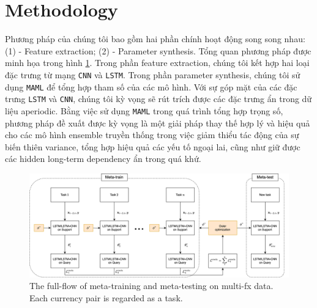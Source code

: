 \documentclass[aps,prb,groupedaddress,twocolumn,showpacs,dvipdfmx,superscriptaddress,pdftex]{revtex4-2}
\begin{document}
\section{Methodology}
\label{sec.method}

Phương pháp của chúng tôi bao gồm hai phần chính hoạt động song song nhau: (1) - Feature extraction; (2) - Parameter synthesis. Tổng quan phương pháp được minh họa trong hình \ref{fig:flow}. Trong phần feature extraction, chúng tôi kết hợp hai loại đặc trưng từ mạng \verb|CNN| và \verb|LSTM|. Trong phần parameter synthesis, chúng tôi sử dụng \verb|MAML| để tổng hợp tham số của các mô hình. Với sự góp mặt của các đặc trưng \verb|LSTM| và \verb|CNN|, chúng tôi kỳ vọng sẽ rút trích được các đặc trưng ẩn trong dữ liệu aperiodic. Bằng việc sử dụng \verb|MAML| trong quá trình tổng hợp trọng số, phương pháp đề xuất được kỳ vọng là một giải pháp thay thế hợp lý và hiệu quả cho các mô hình ensemble truyền thống trong việc giảm thiểu tác động của sự biến thiên variance, tổng hợp hiệu quả các yếu tố ngoại lai, cũng như giữ được các hidden long-term dependency ẩn trong quá khứ.


\begin{figure}[ht]
    \centering
    \includegraphics[width=\textwidth]{img/meta.png}
    \caption{The full-flow of meta-training and meta-testing on multi-fx data. Each currency pair is regarded as a task.}
    \label{fig:flow}
\end{figure}
\end{document}
